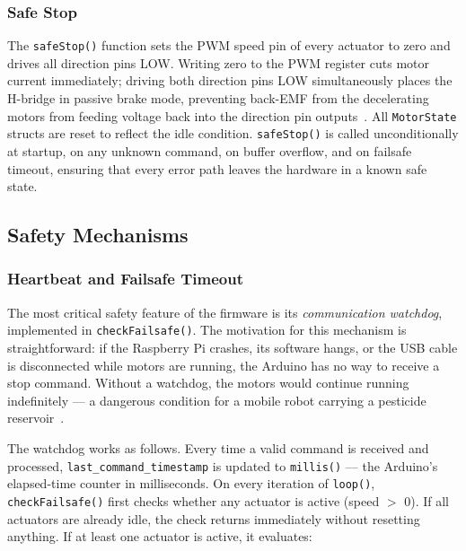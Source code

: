 \subsubsection{Safe Stop}

The \texttt{safeStop()} function sets the PWM speed pin of every
actuator to zero and drives all direction pins LOW. Writing zero to
the PWM register cuts motor current immediately; driving both direction
pins LOW simultaneously places the H-bridge in passive brake mode,
preventing back-EMF from the decelerating motors from feeding voltage
back into the direction pin outputs~\cite{horowitz2015art}. All
\texttt{MotorState} structs are reset to reflect the idle condition.
\texttt{safeStop()} is called unconditionally at startup, on any
unknown command, on buffer overflow, and on failsafe timeout, ensuring
that every error path leaves the hardware in a known safe state.

\subsection{Safety Mechanisms}
\label{sec:safety}

\subsubsection{Heartbeat and Failsafe Timeout}

The most critical safety feature of the firmware is its
\emph{communication watchdog}, implemented in \texttt{checkFailsafe()}.
The motivation for this mechanism is straightforward: if the Raspberry
Pi crashes, its software hangs, or the USB cable is disconnected while
motors are running, the Arduino has no way to receive a stop command.
Without a watchdog, the motors would continue running indefinitely —
a dangerous condition for a mobile robot carrying a pesticide
reservoir~\cite{kopetz2011real}.

The watchdog works as follows. Every time a valid command is received
and processed, \texttt{last\_command\_timestamp} is updated to
\texttt{millis()} — the Arduino's elapsed-time counter in
milliseconds. On every iteration of \texttt{loop()},
\texttt{checkFailsafe()} first checks whether any actuator is active
(speed $>$ 0). If all actuators are already idle, the check returns
immediately without resetting anything. If at least one actuator is
active, it evaluates:

